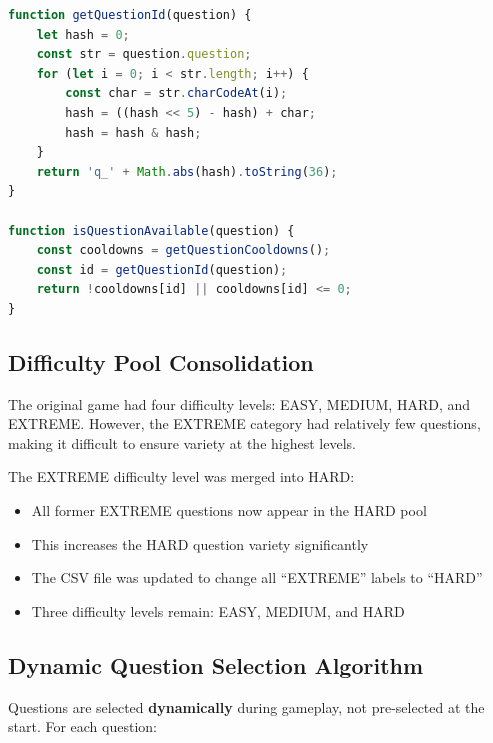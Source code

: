 \documentclass[11pt,a4paper]{article}
\begin{document}
\begin{lstlisting}[language=JavaScript,caption=Question cooldown functions]
function getQuestionId(question) {
    let hash = 0;
    const str = question.question;
    for (let i = 0; i < str.length; i++) {
        const char = str.charCodeAt(i);
        hash = ((hash << 5) - hash) + char;
        hash = hash & hash;
    }
    return 'q_' + Math.abs(hash).toString(36);
}

function isQuestionAvailable(question) {
    const cooldowns = getQuestionCooldowns();
    const id = getQuestionId(question);
    return !cooldowns[id] || cooldowns[id] <= 0;
}
\end{lstlisting}

\subsection{Difficulty Pool Consolidation}

\begin{issuebox}
The original game had four difficulty levels: EASY, MEDIUM, HARD, and EXTREME. However, the EXTREME category had relatively few questions, making it difficult to ensure variety at the highest levels.
\end{issuebox}

\begin{fixbox}
The EXTREME difficulty level was merged into HARD:
\begin{itemize}
    \item All former EXTREME questions now appear in the HARD pool
    \item This increases the HARD question variety significantly
    \item The CSV file was updated to change all ``EXTREME'' labels to ``HARD''
    \item Three difficulty levels remain: EASY, MEDIUM, and HARD
\end{itemize}
\end{fixbox}

\subsection{Dynamic Question Selection Algorithm}

Questions are selected \textbf{dynamically} during gameplay, not pre-selected at the start. For each question:
\end{document}
